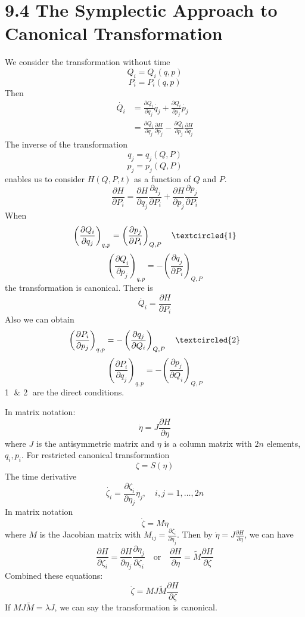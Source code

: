 \documentclass[12pt]{article}
\begin{document}
	\section*{9.4 The Symplectic Approach to Canonical Transformation}
	We consider the transformation without time
	\[ Q_i = Q_i(q, p) \]
	\[ P_i = P_i(q, p) \]
	Then
	\begin{align*}
		\dot{Q_i} &= \frac{\partial Q_i}{\partial q_j}\dot{q_j} + \frac{\partial Q_i}{\partial p_j}\dot{p_j} \\
		&= \frac{\partial Q_i}{\partial q_j}\frac{\partial H}{\partial p_j} - \frac{\partial Q_i}{\partial p_j}\frac{\partial H}{\partial q_j}
	\end{align*}
	The inverse of the transformation
	\[ q_j = q_j(Q, P) \]
	\[ p_j = p_j(Q, P) \]
	enables us to consider $H(Q, P, t)$ as a function of $Q$ and $P$.
	\[ \frac{\partial H}{\partial P_i} = \frac{\partial H}{\partial q_j}\frac{\partial q_j}{\partial P_i} + \frac{\partial H}{\partial p_j}\frac{\partial p_j}{\partial P_i} \]
	When
	\[ \left(\frac{\partial Q_i}{\partial q_j}\right)_{q,p} = \left(\frac{\partial p_j}{\partial P_i}\right)_{Q,P} \quad \textcircled{1} \]
	\[ \left(\frac{\partial Q_i}{\partial p_j}\right)_{q,p} = -\left(\frac{\partial q_j}{\partial P_i}\right)_{Q,P} \]
	the transformation is canonical.
	There is
	\[ \dot{Q_i} = \frac{\partial H}{\partial P_i} \]
	Also we can obtain
	\[ \left(\frac{\partial P_i}{\partial p_j}\right)_{q,p} = -\left(\frac{\partial q_j}{\partial Q_i}\right)_{Q,P} \quad \textcircled{2} \]
	\[ \left(\frac{\partial P_i}{\partial q_j}\right)_{q,p} = -\left(\frac{\partial p_j}{\partial Q_i}\right)_{Q,P} \]
	\textcircled{1} \& \textcircled{2} are the direct conditions.
	
	In matrix notation:
	\[ \dot{\eta} = J \frac{\partial H}{\partial \eta} \]
	where $J$ is the antisymmetric matrix and $\eta$ is a column matrix with $2n$ elements, $q_i, p_i$.
	For restricted canonical transformation
	\[ \zeta = S(\eta) \]
	The time derivative
	\[ \dot{\zeta_i} = \frac{\partial \zeta_i}{\partial \eta_j}\dot{\eta_j}, \quad i,j = 1, \dots, 2n \]
	In matrix notation
	\[ \dot{\zeta} = M\dot{\eta} \]
	where $M$ is the Jacobian matrix with $M_{ij} = \frac{\partial \zeta_i}{\partial \eta_j}$.
	Then by $\dot{\eta} = J\frac{\partial H}{\partial \eta}$, we can have
	\[ \frac{\partial H}{\partial \zeta_i} = \frac{\partial H}{\partial \eta_j}\frac{\partial \eta_j}{\partial \zeta_i} \quad \text{or} \quad \frac{\partial H}{\partial \eta} = \tilde{M}\frac{\partial H}{\partial \zeta} \]
	Combined these equations:
	\[ \dot{\zeta} = M J \tilde{M} \frac{\partial H}{\partial \zeta} \]
	If $M J \tilde{M} = \lambda J$, we can say the transformation is canonical.
\end{document}
